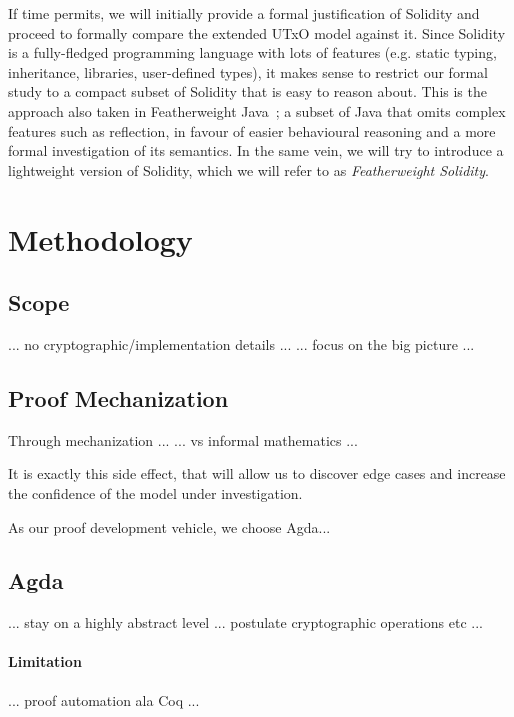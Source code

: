 \documentclass[acmsmall,nonacm=true,screen=true]{acmart}
\newcommand\todocite[0]{}
\begin{document}
If time permits, we will initially provide a formal justification of Solidity and proceed to
formally compare the extended UTxO model against it.
Since Solidity is a fully-fledged programming language with lots of features
(e.g. static typing, inheritance, libraries, user-defined types), it makes sense to 
restrict our formal study to a compact subset of Solidity that is easy to reason about.
This is the approach also taken in Featherweight Java~\cite{featherweightjava}; a subset
of Java that omits complex features such as reflection, in favour of easier behavioural reasoning
and a more formal investigation of its semantics.
In the same vein, we will try to introduce a lightweight version of Solidity, which we will refer to as
\textit{Featherweight Solidity}.

\newpage
\section{Methodology}
\label{sec:methodology}

\subsection{Scope}
... no cryptographic/implementation details ...
... focus on the big picture ...

\subsection{Proof Mechanization}
Through mechanization ...
... vs informal mathematics ...

It is exactly this side effect, that will allow us
to discover edge cases and increase the confidence
of the model under investigation.

As our proof development vehicle, we choose Agda\todocite ...

\subsection{Agda}

... stay on a highly abstract level ... postulate cryptographic operations etc ...

\paragraph{Limitation}
... proof automation ala Coq ...
\end{document}
